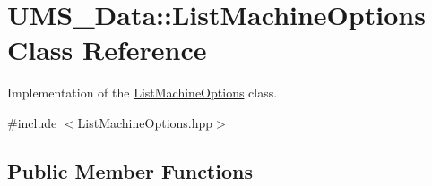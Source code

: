\hypertarget{classUMS__Data_1_1ListMachineOptions}{
\section{UMS\_\-Data::ListMachineOptions Class Reference}
\label{classUMS__Data_1_1ListMachineOptions}
}


Implementation of the \hyperlink{classUMS__Data_1_1ListMachineOptions}{ListMachineOptions} class.  




{\ttfamily \#include $<$ListMachineOptions.hpp$>$}

\subsection*{Public Member Functions}
